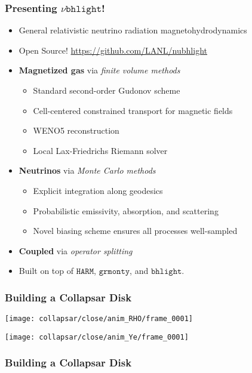 \documentclass[]{beamer}
\begin{document}
\begin{frame}
  \frametitle{Presenting $\nu\texttt{bhlight}$!}
  \begin{itemize}
  \item General relativistic neutrino radiation magnetohydrodynamics
  \item Open Source! {\color{blue}\url{https://github.com/LANL/nubhlight}}
  \item \textbf{Magnetized gas} via \textit{finite volume methods}
    \begin{itemize}
    \item Standard second-order Gudonov scheme
    \item Cell-centered constrained transport for magnetic fields
    \item WENO5 reconstruction
    \item Local Lax-Friedrichs Riemann solver
    \end{itemize}
  \item \textbf{Neutrinos} via \textit{Monte Carlo methods}
    \begin{itemize}
    \item Explicit integration along geodesics
    \item Probabilistic emissivity, absorption, and scattering
    \item Novel biasing scheme ensures all processes well-sampled
    \end{itemize}
  \item \textbf{Coupled} via \textit{operator splitting}
  \item Built on top of $\texttt{HARM}$, $\texttt{grmonty}$, and
    $\texttt{bhlight}$.
  \end{itemize}
\end{frame}

\begin{frame}
  \frametitle{Building a Collapsar Disk}
  \begin{center}
    \texttt{[image: collapsar/close/anim\_RHO/frame\_0001]}
  \end{center}
  \begin{center}
    \texttt{[image: collapsar/close/anim\_Ye/frame\_0001]}
  \end{center}
\end{frame}

\begin{frame}
  \frametitle{Building a Collapsar Disk}
  \begin{center}
  \end{center}
  \begin{center}
  \end{center}
\end{frame}
\end{document}
